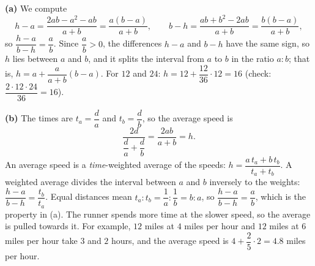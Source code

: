 \textbf{(a)} We compute
\[h-a=\dfrac{2ab-a^2-ab}{a+b}=\dfrac{a(b-a)}{a+b},\qquad b-h=\dfrac{ab+b^2-2ab}{a+b}=\dfrac{b(b-a)}{a+b},\]
so $\dfrac{h-a}{b-h}=\dfrac ab$. Since $\dfrac ab>0$, the differences $h-a$ and $b-h$ have the same sign, so $h$ lies between $a$ and $b$, and it splits the interval from $a$ to $b$ in the ratio $a:b$; that is, $h=a+\dfrac{a}{a+b}(b-a)$. For $12$ and $24$: $h=12+\dfrac{12}{36}\cdot12=\boxed{16}$ (check: $\dfrac{2\cdot12\cdot24}{36}=16$).

\textbf{(b)} The times are $t_a=\dfrac da$ and $t_b=\dfrac db$, so the average speed is
\[\dfrac{2d}{\dfrac da+\dfrac db}=\dfrac{2ab}{a+b}=h.\]
An average speed is a \emph{time}-weighted average of the speeds: $h=\dfrac{a\,t_a+b\,t_b}{t_a+t_b}$. A weighted average divides the interval between $a$ and $b$ inversely to the weights: $\dfrac{h-a}{b-h}=\dfrac{t_b}{t_a}$. Equal distances mean $t_a:t_b=\dfrac1a:\dfrac1b=b:a$, so $\dfrac{h-a}{b-h}=\dfrac ab$, which is the property in (a). The runner spends more time at the slower speed, so the average is pulled towards it. For example, $12$ miles at $4$ miles per hour and $12$ miles at $6$ miles per hour take $3$ and $2$ hours, and the average speed is $4+\dfrac{2}{5}\cdot2=4.8$ miles per hour.
